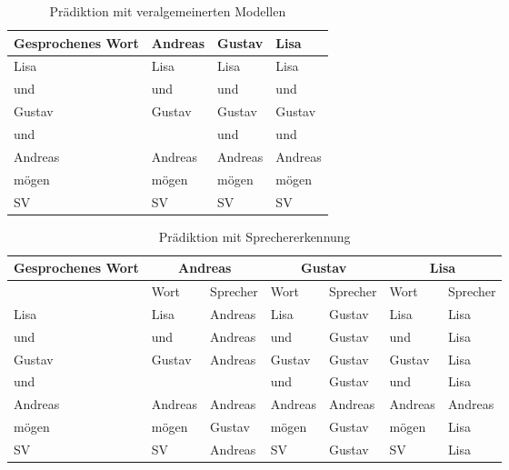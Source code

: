 \begin{table}[!hp]
\centering
{}
\begin{tabular}{|l||l|l|l|}
\hline
Gesprochenes Wort & Andreas & Gustav  & Lisa 	\\\hline\hline
Lisa     		   & Lisa 	 & Lisa	   & Lisa	\\ \hline
und		  		   & und  	 & und	   & und	\\ \hline
Gustav			   & Gustav  & Gustav  & Gustav	\\ \hline
und				   & 	 	 & und	   & und	\\ \hline
Andreas			   & Andreas & Andreas & Andreas\\ \hline
mögen			   & mögen	 & mögen   & mögen	\\ \hline
SV				   & SV		 & SV	   & SV	\\ \hline
\end{tabular}
\caption[Prädiktion mit veralgemeinerten Modellen]{Prädiktion mit veralgemeinerten Modellen}
\label{tab:predict_ALL_1}
\end{table}

\begin{table}[!hp]
\centering
{}
\begin{tabular}{|l||l|l|l|l|l|l|}
\hline
Gesprochenes Wort & \multicolumn{2}{|c|}{Andreas} & \multicolumn{2}{|c|}{Gustav} & \multicolumn{2}{|c|}{Lisa} \\ \hline
		& Wort	 & Sprecher& Wort	& Sprecher & Wort 	& Sprecher\\	\hline \hline
Lisa    & Lisa 	 & Andreas & Lisa	& Gustav   & Lisa	& Lisa	\\ \hline
und		& und  	 & Andreas & und	& Gustav   & und	& Lisa	\\ \hline
Gustav	& Gustav & Andreas & Gustav & Gustav   & Gustav	& Lisa	\\ \hline
und		& 	 	 & 		   & und	& Gustav   & und	& Lisa	\\ \hline
Andreas	& Andreas& Andreas & Andreas& Andreas  & Andreas& Andreas \\ \hline
mögen	& mögen	 & Gustav  & mögen  & Gustav   & mögen	& Lisa	\\ \hline
SV		& SV	 & Andreas & SV	    & Gustav   & SV		& Lisa	\\ \hline
\end{tabular}
\caption[Prädiktion mit Sprechererkennung]{Prädiktion mit Sprechererkennung}
\label{tab:predict_Speaker_1}
\end{table}

